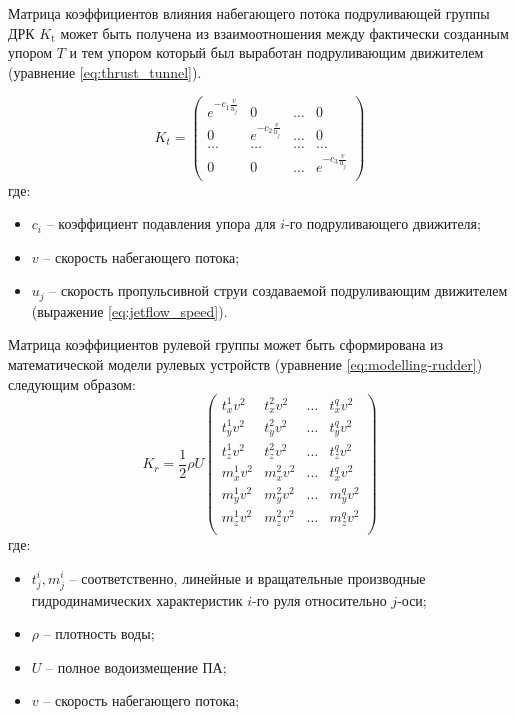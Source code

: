 Матрица коэффициентов влияния набегающего потока подруливающей группы ДРК $K_{\text{t}}$ может быть получена из взаимоотношения между фактически созданным упором $T$ и тем упором который был выработан подруливающим движителем (уравнение \ref{eq:thrust_tunnel}).

\begin{equation}
    \label{eq:flow_matrix}
    K_t = 
    \begin{pmatrix}
        e^{-c_1\frac{v}{u_j}} & 0 & \ldots & 0 \\
        0 & e^{-c_2\frac{v}{u_j}} & \ldots & 0 \\
        \ldots & \ldots & \ldots & \ldots \\
        0 & 0 & \ldots & e^{-c_3\frac{v}{u_j}} \\
    \end{pmatrix}
\end{equation}
\noindent где:
\begin{itemize}
    \item $c_i$ -- коэффициент подавления упора для $i$-го подруливающего движителя;
    \item $v$ -- скорость набегающего потока;
    \item $u_j$ -- скорость пропульсивной струи создаваемой подруливающим движителем (выражение \ref{eq:jetflow_speed}).
\end{itemize}

Матрица коэффициентов рулевой группы может быть сформирована из математической модели рулевых устройств (уравнение \ref{eq:modelling-rudder}) следующим образом:
\begin{equation}
    K_r = 
    \frac{1}{2}\rho U
    \begin{pmatrix}
        t_x^{1} v^2 & t_x^{2} v^2 & \ldots & t_x^{q} v^2 \\
        t_y^{1} v^2 & t_y^{2} v^2 & \ldots & t_y^{q} v^2 \\
        t_z^{1} v^2 & t_z^{2} v^2 & \ldots & t_z^{q} v^2 \\
        m_x^{1} v^2 & m_x^{2} v^2 & \ldots & t_x^{q} v^2 \\
        m_y^{1} v^2 & m_y^{2} v^2 & \ldots & m_y^{q} v^2 \\
        m_z^{1} v^2 & m_z^{2} v^2 & \ldots & m_z^{q} v^2 \\
    \end{pmatrix}
\end{equation}
\noindent где:
\begin{itemize}
    \item $t_j^{i}, m_j^{i}$ -- соответственно, линейные и вращательные производные гидродинамических характеристик $i$-го руля относительно $j$-оси;
    \item $\rho$ -- плотность воды;
    \item $U$ -- полное водоизмещение ПА;
    \item $v$ -- скорость набегающего потока;
\end{itemize}

